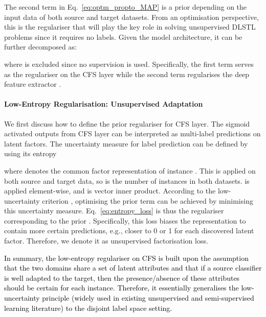 \documentclass[letterpaper]{article} \usepackage{aaai19}  \usepackage{times}  \usepackage{helvet}  \usepackage{courier}  \usepackage{url}  \usepackage{graphicx}
\begin{document}
The second term  in Eq.~\ref{eq:optm_propto_MAP} is a prior depending on the input data  of both source and target datasets. From an optimisation perspective, this is the regulariser that will play the key role in solving unsupervised DLSTL problems since it requires no labels. Given the model architecture, it can be further decomposed as:


where  is excluded since no supervision is used. Specifically, the first term  serves as the regulariser on the CFS layer while the second term  regularises the deep feature extractor .

\paragraph{Low-Entropy Regularisation: Unsupervised Adaptation}

We first discuss how to define the prior  regulariser for CFS layer. The sigmoid activated outputs  from CFS layer  can be interpreted as multi-label predictions on latent factors. The uncertainty measure for label prediction can be defined by using its entropy

where  denotes the common factor representation  of instance . This is applied on both source and target data, so   is the number of instances in both datasets.  is applied element-wise, and  is vector inner product.
According to the low-uncertainty criterion \cite{carlucci2017autodial}, optimising the prior term  can be achieved by minimising this uncertainty measure. Eq.~\ref{eq:entropy_loss} is thus the regulariser corresponding to the prior . 
Specifically, this loss biases the representation  to contain more certain predictions, e.g., closer to 0 or 1 for each discovered latent factor. Therefore, we denote it as unsupervised factorisation loss.

\textcolor{black}{In summary, the low-entropy regulariser on CFS is built upon the assumption that the two domains share a set of latent attributes and that if a source classifier is well adapted to the target, then the presence/absence of these attributes should be certain for each instance. Therefore, it essentially generalises the low-uncertainty principle (widely used in existing unsupervised and semi-supervised learning literature) to the disjoint label space setting.}
\end{document}
